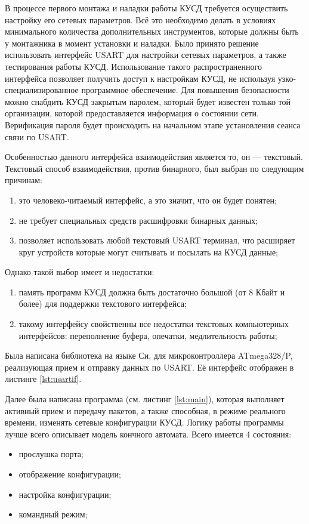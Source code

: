 В процессе первого монтажа и наладки работы КУСД требуется осуществить настройку его сетевых параметров. Всё это необходимо делать в условиях минимального количества дополнительных инструментов, которые должны быть у монтажника в момент установки и наладки. Было принято решение использовать интерфейс USART для настройки сетевых параметров, а также тестирования работы КУСД. Использование такого распространенного интерфейса позволяет получить доступ к настройкам КУСД, не используя узко-специализированное программное обеспечение. Для повышения безопасности можно снабдить КУСД закрытым паролем, который будет известен только той организации, которой предоставляется информация о состоянии сети. Верификация пароля будет происходить на начальном этапе установления сеанса связи по USART.

Особенностью данного интерфейса взаимодействия является то, он --- текстовый. Текстовый способ взаимодействия, против бинарного, был выбран по следующим причинам:
\begin{enumerate}
	\item это человеко-читаемый интерфейс, а это значит, что он будет понятен;
	\item не требует специальных средств расшифровки бинарных данных;
	\item позволяет использовать любой текстовый USART терминал, что расширяет круг устройств которые могут считывать и посылать на КУСД данные;
\end{enumerate}

Однако такой выбор имеет и недостатки:
\begin{enumerate}
	\item память программ КУСД должна быть достаточно большой (от 8 Кбайт и более) для поддержки текстового интерфейса;
	\item такому интерфейсу свойственны все недостатки текстовых компьютерных интерфейсов: переполнение буфера, опечатки, медлительность работы;
\end{enumerate}

Была написана библиотека на языке Си, для микроконтроллера ATmega328/P, реализующая прием и отправку данных по USART. Её интерфейс отображен в листинге \ref{lst:usartif}.

{\small{}}

Далее была написана программа (см. листинг \ref{lst:main}), которая выполняет активный прием и передачу пакетов, а также способная, в режиме реального времени, изменять сетевые конфигурации КУСД. Логику работы программы лучше всего описывает модель кончного автомата. Всего имеется 4 состояния:
\begin{itemize}
	\item прослушка порта;
	\item отображение конфигурации;
	\item настройка конфигурации;
	\item командный режим;
\end{itemize}

